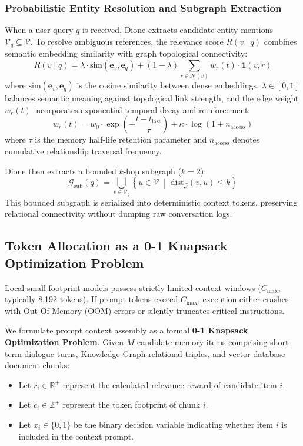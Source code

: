 \documentclass[conference,a4paper]{IEEEtran}
\begin{document}
\subsubsection{Probabilistic Entity Resolution and Subgraph Extraction}
When a user query $q$ is received, Dione extracts candidate entity mentions $\mathcal{V}_q \subseteq \mathcal{V}$. To resolve ambiguous references, the relevance score $R(v \mid q)$ combines semantic embedding similarity with graph topological connectivity:
\begin{equation}
R(v \mid q) = \lambda \cdot \text{sim}(\mathbf{e}_v, \mathbf{e}_q) + (1 - \lambda) \sum_{r \in \mathcal{N}(v)} w_r(t) \cdot \mathbf{1}(v, r)
\end{equation}
where $\text{sim}(\mathbf{e}_v, \mathbf{e}_q)$ is the cosine similarity between dense embeddings, $\lambda \in [0, 1]$ balances semantic meaning against topological link strength, and the edge weight $w_r(t)$ incorporates exponential temporal decay and reinforcement:
\begin{equation}
w_r(t) = w_0 \cdot \exp\left(-\frac{t - t_{\text{last}}}{\tau}\right) + \kappa \cdot \log(1 + n_{\text{access}})
\end{equation}
where $\tau$ is the memory half-life retention parameter and $n_{\text{access}}$ denotes cumulative relationship traversal frequency.

Dione then extracts a bounded $k$-hop subgraph ($k=2$):
\begin{equation}
\mathcal{G}_{\text{sub}}(q) = \bigcup_{v \in \mathcal{V}_q} \left\{ u \in \mathcal{V} \;\middle|\; \text{dist}_{\mathcal{G}}(v, u) \le k \right\}
\end{equation}
This bounded subgraph is serialized into deterministic context tokens, preserving relational connectivity without dumping raw conversation logs.

\subsection{Token Allocation as a 0-1 Knapsack Optimization Problem}
Local small-footprint models possess strictly limited context windows ($C_{\text{max}}$, typically 8,192 tokens). If prompt tokens exceed $C_{\text{max}}$, execution either crashes with Out-Of-Memory (OOM) errors or silently truncates critical instructions.

We formulate prompt context assembly as a formal \textbf{0-1 Knapsack Optimization Problem}. Given $M$ candidate memory items comprising short-term dialogue turns, Knowledge Graph relational triples, and vector database document chunks:
\begin{itemize}
    \item Let $r_i \in \mathbb{R}^+$ represent the calculated relevance reward of candidate item $i$.
    \item Let $c_i \in \mathbb{Z}^+$ represent the token footprint of chunk $i$.
    \item Let $x_i \in \{0, 1\}$ be the binary decision variable indicating whether item $i$ is included in the context prompt.
\end{itemize}
\end{document}
